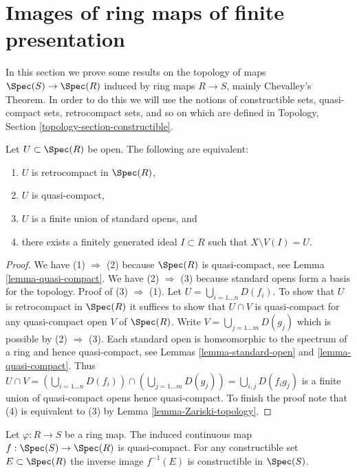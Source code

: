 \section{Images of ring maps of finite presentation}
\label{section-images-finite-presentation}

\noindent
In this section we prove some results on the
topology of maps $\Spec(S) \to \Spec(R)$
induced by ring maps $R \to S$, mainly Chevalley's Theorem.
In order to do this we will use the notions of constructible sets,
quasi-compact sets, retrocompact sets, and so on
which are defined in Topology, Section \ref{topology-section-constructible}.

\begin{lemma}
\label{lemma-qc-open}
Let $U \subset \Spec(R)$ be open. The following
are equivalent:
\begin{enumerate}
\item $U$ is retrocompact in $\Spec(R)$,
\item $U$ is quasi-compact,
\item $U$ is a finite union of standard opens, and
\item there exists a finitely generated ideal $I \subset R$ such
that $X \setminus V(I) = U$.
\end{enumerate}
\end{lemma}

\begin{proof}
We have (1) $\Rightarrow$ (2) because $\Spec(R)$ is quasi-compact, see
Lemma \ref{lemma-quasi-compact}. We have (2) $\Rightarrow$ (3) because
standard opens form a basis for the topology. Proof of (3) $\Rightarrow$ (1).
Let $U = \bigcup_{i = 1\ldots n} D(f_i)$. To show that $U$ is retrocompact
in $\Spec(R)$ it suffices to show that $U \cap V$ is quasi-compact for any
quasi-compact open $V$ of $\Spec(R)$. Write
$V = \bigcup_{j = 1\ldots m} D(g_j)$ which is possible by (2) $\Rightarrow$
(3). Each standard open is homeomorphic to the spectrum of a ring and hence
quasi-compact, see Lemmas \ref{lemma-standard-open} and
\ref{lemma-quasi-compact}. Thus
$U \cap V =
(\bigcup_{i = 1\ldots n} D(f_i)) \cap (\bigcup_{j = 1\ldots m} D(g_j))
= \bigcup_{i, j} D(f_i g_j)$ is a finite union of quasi-compact opens
hence quasi-compact. To finish the proof note
that (4) is equivalent to (3) by 
Lemma \ref{lemma-Zariski-topology}.
\end{proof}

\begin{lemma}
\label{lemma-affine-map-quasi-compact}
Let $\varphi : R \to S$ be a ring map.
The induced continuous map $f : \Spec(S) \to \Spec(R)$
is quasi-compact. For any constructible set $E \subset \Spec(R)$
the inverse image $f^{-1}(E)$ is constructible in $\Spec(S)$.
\end{lemma}

